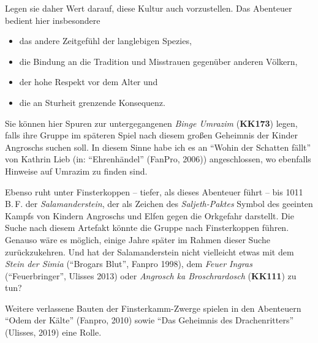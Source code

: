 Legen sie daher Wert darauf, diese Kultur auch vorzustellen. Das Abenteuer bedient hier insbesondere
\begin{itemize}
	\item das andere Zeitgefühl der langlebigen Spezies,
	\item die Bindung an die Tradition und Misstrauen gegenüber anderen Völkern,
	\item der hohe Respekt vor dem Alter und
	\item die an Sturheit grenzende Konsequenz.
\end{itemize}

Sie können hier  Spuren zur untergegangenen \emph{Binge Umrazim} (\textbf{KK173}) legen,
falls ihre Gruppe im späteren Spiel nach diesem großen Geheimnis der Kinder Angroschs suchen soll.
In diesem Sinne habe ich es an \enquote{Wohin der Schatten fällt} von Kathrin Lieb (in: \enquote{Ehrenhändel} (FanPro, 2006)) angeschlossen, wo ebenfalls Hinweise auf Umrazim zu finden sind.

Ebenso ruht unter Finsterkoppen -- tiefer, als dieses Abenteuer führt -- bis 1011 B.\,F. der \emph{Salamanderstein}, der als Zeichen des \emph{Saljeth-Paktes} Symbol des geeinten Kampfs von Kindern Angroschs und Elfen gegen die Orkgefahr darstellt.
Die Suche nach diesem Artefakt könnte die Gruppe nach Finsterkoppen führen.
Genauso wäre es möglich, einige Jahre später im Rahmen dieser Suche zurückzukehren.
Und hat der Salamanderstein nicht vielleicht etwas mit dem \emph{Stein der Simia} (\enquote{Brogars Blut}, Fanpro 1998), dem \emph{Feuer Ingras} (\enquote{Feuerbringer}, Ulisses 2013) oder \emph{Angrosch ka Broschrardosch} (\textbf{KK111}) zu tun?

Weitere verlassene Bauten der Finsterkamm-Zwerge spielen in den Abenteuern \enquote{Odem der Kälte} (Fanpro, 2010) sowie \enquote{Das Geheimnis des Drachenritters} (Ulisses, 2019) eine Rolle.
\spaltenende

\neueseite

